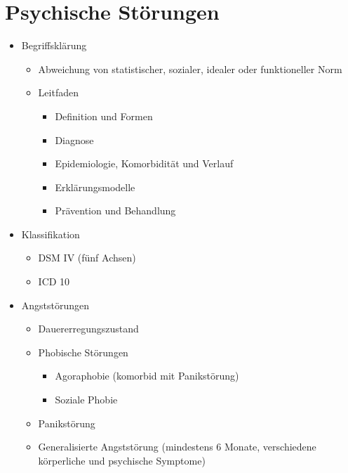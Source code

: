 \documentclass[11pt, paper=a4, twocolumn]{scrartcl}
\begin{document}
	\section{Psychische Störungen}

	\begin{itemize}
		\item Begriffsklärung
			\begin{itemize}
				\item Abweichung von statistischer, sozialer, idealer oder 
					funktioneller Norm
				\item Leitfaden
					\begin{itemize}
						\item Definition und Formen
						\item Diagnose
						\item Epidemiologie, Komorbidität und 
							Verlauf
						\item Erklärungsmodelle
						\item Prävention und Behandlung
					\end{itemize}
			\end{itemize}

		\item Klassifikation
			\begin{itemize}
				\item DSM IV (fünf Achsen)
				\item ICD 10 
			\end{itemize}

		\item Angststörungen
			\begin{itemize}
				\item Dauererregungszustand
				\item Phobische Störungen
					\begin{itemize}
						\item Agoraphobie (komorbid mit 
							Panikstörung)
						\item Soziale Phobie
					\end{itemize}
				\item Panikstörung
				\item Generalisierte Angststörung (mindestens 6 Monate, 
					verschiedene körperliche und psychische Symptome)
			\end{itemize}


\end{itemize}
\end{document}
